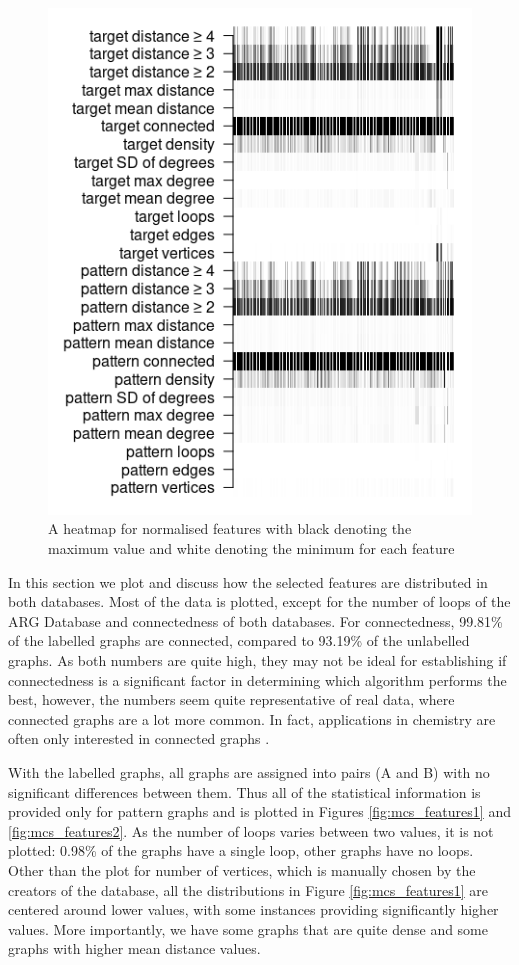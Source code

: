 \documentclass{l4proj}
\theoremstyle{definition}
\theoremstyle{remark}
\begin{document}
\begin{figure}
  \centering
  \includegraphics{images/features_heatmap.png}
  \caption{A heatmap for normalised features with black denoting the maximum
    value and white denoting the minimum for each feature}
  \label{fig:features_heatmap}
\end{figure}

In this section we plot and discuss how the selected features are distributed in
both databases. Most of the data is plotted, except for the number of loops
of the ARG Database and connectedness of both databases. For connectedness,
99.81\% of the labelled graphs are connected, compared to 93.19\% of the
unlabelled graphs. As both numbers are quite high, they may not be ideal for
establishing if connectedness is a significant factor in determining which
algorithm performs the best, however, the numbers seem quite representative of
real data, where connected graphs are a lot more common. In fact, applications
in chemistry are often only interested in connected graphs \cite{WCMS:WCMS5}.

With the labelled graphs, all graphs are assigned into pairs (A and B) with no
significant differences between them. Thus all of the statistical information is
provided only for pattern graphs and is plotted in Figures
\ref{fig:mcs_features1} and \ref{fig:mcs_features2}. As the number of loops
varies between two values, it is not plotted: 0.98\% of the graphs have a
single loop, other graphs have no loops. Other than the plot for number of
vertices, which is manually chosen by the creators of the database, all the
distributions in Figure \ref{fig:mcs_features1} are centered around lower
values, with some instances providing significantly higher values. More
importantly, we have some graphs that are quite dense and some graphs with
higher mean distance values.
\end{document}
